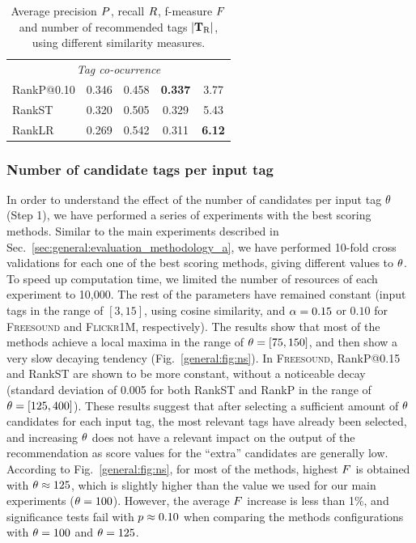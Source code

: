 \begin{table}
\begin{center}
{\begin{tabular}{@{}lcccc@{}}
      \multicolumn{5}{c}{\rule{0pt}{2ex} \emph{Tag co-ocurrence}} \\ 
      RankP@0.10 & 0.346 & 0.458 & \textbf{0.337} & 3.77 \\ 
      RankST & 0.320 & 0.505 & 0.329 & 5.43 \\ 
      RankLR & 0.269 & 0.542 & 0.311 & \textbf{6.12} \\ 
      \bottomrule
    \end{tabular}
  }
  \caption[Average precision, recall, f-measure and number of recommended tags using different similarity measures]{Average precision $P$, recall $R$, f-measure $F$ and number of recommended tags $|\mathbf{T}_{\text{R}}|$, using different similarity measures.}
  \label{tab:sims}
  \end{center}
\end{table}


\subsubsection{Number of candidate tags per input tag}

In order to understand the effect of the number of candidates per input tag $\theta$ (Step 1), we have performed a series of experiments with the best scoring methods. Similar to the main experiments described in Sec.~\ref{sec:general:evaluation_methodology_a}, we have performed 10-fold cross validations for each one of the best scoring methods, giving different values to $\theta$. To speed up computation time, we limited the number of resources of each experiment to 10,000. The rest of the parameters have remained constant (input tags in the range of $[3,15]$, using cosine similarity, and $\alpha=0.15$ or $0.10$ for \textsc{Freesound} and \textsc{Flickr1M}, respectively). The results show that most of the methods achieve a local maxima in the range of $\theta=[75,150]$, and then show a very slow decaying tendency (Fig.~\ref{general:fig:ns}). In \textsc{Freesound}, RankP@0.15 and RankST are shown to be more constant, without a 
noticeable decay (standard deviation of 0.005 for both RankST and RankP in the range of $\theta=[125,400]$). These results suggest that after selecting a sufficient amount of $\theta$ candidates for each input tag, the most relevant tags have already been selected, and increasing $\theta$ does not have a relevant impact on the output of the recommendation as score values for the ``extra'' candidates are generally low. 
According to Fig.~\ref{general:fig:ns}, for most of the methods, highest $F$ is obtained with $\theta\approx 125$, which is slightly higher than the value we used for our main experiments ($\theta=100$). However, the average $F$ increase is less than 1\%, and significance tests fail with $p \approx 0.10$ when comparing the methods configurations with $\theta=100$ and $\theta=125$.

